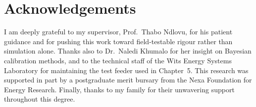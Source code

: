 \chapter*{Acknowledgements}

I am deeply grateful to my supervisor, Prof.\ Thabo Ndlovu, for his patient guidance and
for pushing this work toward field-testable rigour rather than simulation alone. Thanks also
to Dr.\ Naledi Khumalo for her insight on Bayesian calibration methods, and to the technical
staff of the Wits Energy Systems Laboratory for maintaining the test feeder used in
Chapter~5. This research was supported in part by a postgraduate merit bursary from the
Nexa Foundation for Energy Research. Finally, thanks to my family for their unwavering
support throughout this degree.

\tableofcontents
\listoffigures
\listoftables

